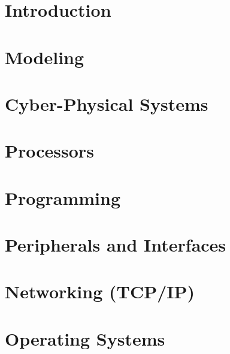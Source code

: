 \chapter{Introduction}


\chapter{Modeling}


\chapter{Cyber-Physical Systems}


\chapter{Processors}


\chapter{Programming}


\chapter{Peripherals and Interfaces}


\chapter{Networking (TCP/IP)}



\chapter{Operating Systems}







